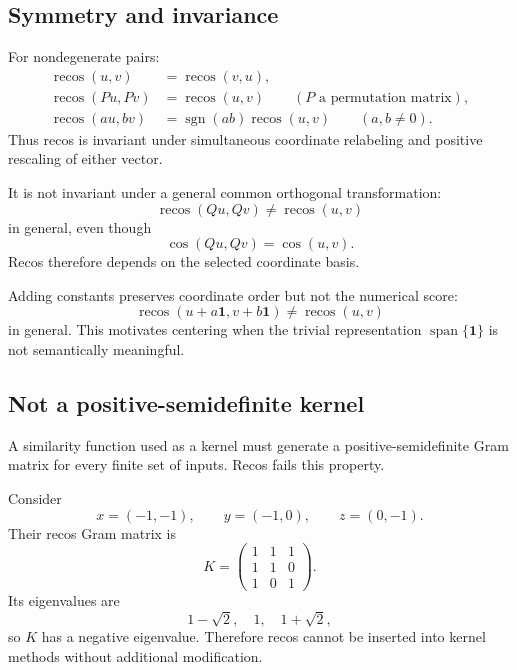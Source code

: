 \documentclass[11pt,a4paper]{article}
\newcommand{\sgn}{\operatorname{sgn}}
\newcommand{\recos}{\operatorname{recos}}
\newcommand{\cosim}{\operatorname{cos}}
\newcommand{\one}{\mathbf{1}}
\begin{document}
\subsection{Symmetry and invariance}

For nondegenerate pairs:
\begin{align}
    \recos(u,v)&=\recos(v,u),\\
    \recos(Pu,Pv)&=\recos(u,v)
    \qquad(P\text{ a permutation matrix}),\\
    \recos(au,bv)&=\sgn(ab)\recos(u,v)
    \qquad(a,b\neq0).
\end{align}
Thus recos is invariant under simultaneous coordinate relabeling and positive rescaling of either vector.

It is not invariant under a general common orthogonal transformation:
\begin{equation}
    \recos(Qu,Qv)\neq\recos(u,v)
\end{equation}
in general, even though
\begin{equation}
    \cosim(Qu,Qv)=\cosim(u,v).
\end{equation}
Recos therefore depends on the selected coordinate basis.

Adding constants preserves coordinate order but not the numerical score:
\begin{equation}
    \recos(u+a\one,v+b\one)
    \neq\recos(u,v)
\end{equation}
in general. This motivates centering when the trivial representation $\operatorname{span}\{\one\}$ is not semantically meaningful.

\subsection{Not a positive-semidefinite kernel}

A similarity function used as a kernel must generate a positive-semidefinite Gram matrix for every finite set of inputs. Recos fails this property.

Consider
\begin{equation}
    x=(-1,-1),
    \qquad
    y=(-1,0),
    \qquad
    z=(0,-1).
\end{equation}
Their recos Gram matrix is
\begin{equation}
    K=
    \begin{pmatrix}
    1&1&1\\
    1&1&0\\
    1&0&1
    \end{pmatrix}.
\end{equation}
Its eigenvalues are
\begin{equation}
    1-\sqrt{2},\quad 1,\quad 1+\sqrt{2},
\end{equation}
so $K$ has a negative eigenvalue. Therefore recos cannot be inserted into kernel methods without additional modification.
\end{document}
